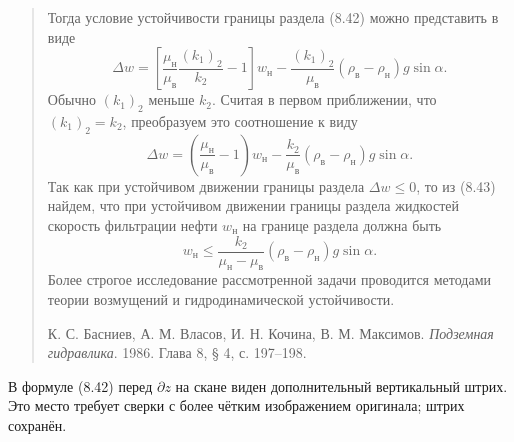 \documentclass[12pt,a4paper]{article}
\begin{document}
\begin{quote}
Тогда условие устойчивости границы раздела (8.42) можно представить в виде
\[
\Delta w=\left[\frac{\mu_\text{н}}{\mu_\text{в}}\frac{(k_1)_2}{k_2}-1\right]w_\text{н}-\frac{(k_1)_2}{\mu_\text{в}}(\rho_\text{в}-\rho_\text{н})g\sin\alpha.
\]
Обычно $(k_1)_2$ меньше $k_2$. Считая в первом приближении, что $(k_1)_2=k_2$, преобразуем это соотношение к виду
\begin{equation}\Delta w=\left(\frac{\mu_\text{н}}{\mu_\text{в}}-1\right)w_\text{н}-\frac{k_2}{\mu_\text{в}}(\rho_\text{в}-\rho_\text{н})g\sin\alpha.\tag{8.43}\label{q9:eq-8-43}\end{equation}
Так как при устойчивом движении границы раздела $\Delta w\le0$, то из (8.43) найдем, что при устойчивом движении границы раздела жидкостей скорость фильтрации нефти $w_\text{н}$ на границе раздела должна быть
\[
w_\text{н}\le\frac{k_2}{\mu_\text{н}-\mu_\text{в}}(\rho_\text{в}-\rho_\text{н})g\sin\alpha.
\]
Более строгое исследование рассмотренной задачи проводится методами теории возмущений и гидродинамической устойчивости.
\par\nobreak\smallskip
{\small К. С. Басниев, А. М. Власов, И. Н. Кочина, В. М. Максимов. \textit{Подземная гидравлика}. 1986. Глава 8, § 4, с. 197--198.}\par
\end{quote}

\noindent В формуле (8.42) перед $\partial z$ на скане виден дополнительный вертикальный штрих. Это место требует сверки с более чётким изображением оригинала; штрих сохранён.
\end{document}
